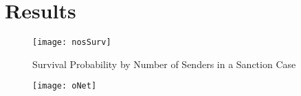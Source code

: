 \section{Results}
\label{Results} 



\begin{figure}[ht]
	\centering
	\caption{Survival Probability by Number of Senders in a Sanction Case}
	\texttt{[image: nosSurv]}
\end{figure}

\begin{figure}[ht]
	\centering
	\texttt{[image: oNet]}
\end{figure}


